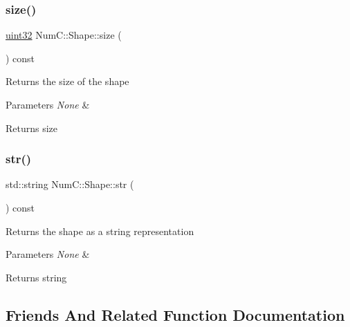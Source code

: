 \subsubsection{\texorpdfstring{size()}{size()}}
{\footnotesize\ttfamily \mbox{\hyperlink{namespace_num_c_ae685802ca6d3035f2b400b081e3953fa}{uint32}} Num\+C\+::\+Shape\+::size (\begin{DoxyParamCaption}{ }\end{DoxyParamCaption}) const\hspace{0.3cm}{\ttfamily [inline]}}

Returns the size of the shape


\begin{DoxyParams}{Parameters}
{\em None} & \\
\hline
\end{DoxyParams}
\begin{DoxyReturn}{Returns}
size 
\end{DoxyReturn}
\mbox{\label{class_num_c_1_1_shape_ae3e28b5a109ab81255adb2f1f7f88dbf}} 
\subsubsection{\texorpdfstring{str()}{str()}}
{\footnotesize\ttfamily std\+::string Num\+C\+::\+Shape\+::str (\begin{DoxyParamCaption}{ }\end{DoxyParamCaption}) const\hspace{0.3cm}{\ttfamily [inline]}}

Returns the shape as a string representation


\begin{DoxyParams}{Parameters}
{\em None} & \\
\hline
\end{DoxyParams}
\begin{DoxyReturn}{Returns}
string 
\end{DoxyReturn}


\subsection{Friends And Related Function Documentation}
\mbox{\label{class_num_c_1_1_shape_a520d818f31bbdacdf8cfbe6de9e88a28}} 

